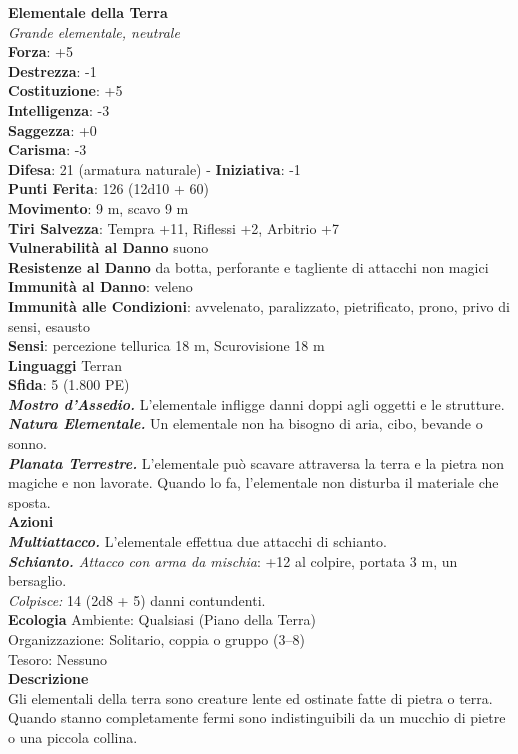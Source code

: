 \begin{multicols}{2}
\medskip\textbf{Elementale della Terra}\\
\emph{Grande elementale, neutrale}\\
\textbf{Forza}: +5\\
\textbf{Destrezza}: -1\\
\textbf{Costituzione}: +5\\
\textbf{Intelligenza}: -3\\
\textbf{Saggezza}: +0\\
\textbf{Carisma}: -3\\
\textbf{Difesa}: 21 (armatura naturale) - \textbf{Iniziativa}: -1\\
\textbf{Punti Ferita}: 126 (12d10 + 60)\\
\textbf{Movimento}: 9 m, scavo 9 m\\
\textbf{Tiri Salvezza}: Tempra +11, Riflessi +2, Arbitrio +7\\
\textbf{Vulnerabilità al Danno} suono\\
\textbf{Resistenze al Danno} da botta, perforante e tagliente di attacchi non magici\\
\textbf{Immunità al Danno}: veleno\\
\textbf{Immunità alle Condizioni}: avvelenato, paralizzato, pietrificato, prono, privo di sensi, esausto\\
\textbf{Sensi}: percezione tellurica 18 m, Scurovisione 18 m\\
\textbf{Linguaggi} Terran\\
\textbf{Sfida}: 5 (1.800 PE)\smallskip\\
\emph{\textbf{Mostro d'Assedio.}} L'elementale infligge danni doppi agli oggetti e le strutture.\\
\emph{\textbf{Natura Elementale.}} Un elementale non ha bisogno di aria, cibo, bevande o sonno.\\
\emph{\textbf{Planata Terrestre.}} L'elementale può scavare attraversa la terra e la pietra non magiche e non lavorate. Quando lo fa, l'elementale non disturba il materiale che sposta.\\
\smallskip\textbf{Azioni}\\
\emph{\textbf{Multiattacco.}} L'elementale effettua due attacchi di schianto.\\
\emph{\textbf{Schianto.} Attacco con arma da mischia}: +12 al colpire, portata 3 m, un bersaglio.\\
\emph{Colpisce:} 14 (2d8 + 5) danni contundenti.\\
\textbf{Ecologia}
Ambiente: Qualsiasi (Piano della Terra)\\
Organizzazione: Solitario, coppia o gruppo (3–8)\\
Tesoro: Nessuno\\
\textbf{Descrizione}\\
Gli elementali della terra sono creature lente ed ostinate fatte di pietra o terra. Quando stanno completamente fermi sono indistinguibili da un mucchio di pietre o una piccola collina.\\


\end{multicols}
